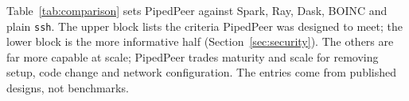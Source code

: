 Table~\ref{tab:comparison} sets PipedPeer against Spark, Ray, Dask, BOINC and
plain \texttt{ssh}. The upper block lists the criteria PipedPeer was designed
to meet; the lower block is the more informative half
(Section~\ref{sec:security}). The others are far more capable at scale;
PipedPeer trades maturity and scale for removing setup, code change and network
configuration. The entries come from published designs, not benchmarks.
